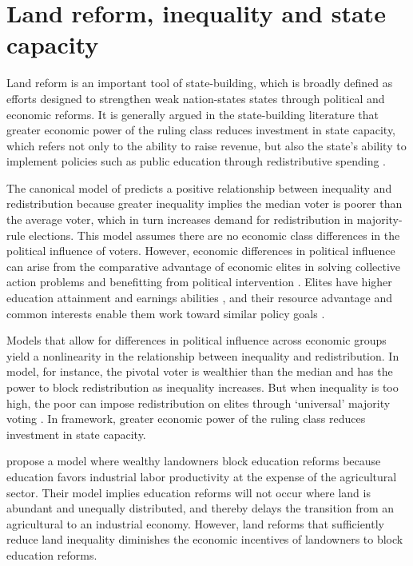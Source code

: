 \section{Land reform, inequality and state capacity}

Land reform is an important tool of state-building, which is broadly defined as efforts designed to strengthen weak nation-states states through political and economic reforms. It is generally argued in the state-building literature that greater economic power of the ruling class reduces investment in state capacity, which refers not only to the ability to raise revenue, but also the state’s ability to implement policies such as public education through redistributive spending \citep{besley2010state}. 

The canonical model of \citet{meltzer1981rational} predicts a positive relationship between inequality and redistribution because greater inequality implies the median voter is poorer than the average voter, which in turn increases demand for redistribution in majority-rule elections. This model assumes there are no economic class differences in the political influence of voters. However, economic differences in political influence can arise from the comparative advantage of economic elites in solving collective action problems and benefitting from political intervention \citep{acemoglu2008persistence}. Elites have higher education attainment and earnings abilities \citep{bourguignon2000oligarchy}, and their resource advantage and common interests enable them work toward similar policy goals \citep{winters2009}. 

Models that allow for differences in political influence across economic groups yield a nonlinearity in the relationship between inequality and redistribution. In  model, for instance, the pivotal voter is wealthier than the median and has the power to block redistribution as inequality increases. But when inequality is too high, the poor can impose redistribution on elites through `universal' majority voting \citep{perotti1993political,saint1993education}. In  framework, greater economic power of the ruling class reduces investment in state capacity. 

\citet{galor2009inequality} propose a model where wealthy landowners block education reforms because education favors industrial labor productivity at the expense of the agricultural sector. Their model implies education reforms will not occur where land is abundant and unequally distributed, and thereby delays the transition from an agricultural to an industrial economy. However, land reforms that sufficiently reduce land inequality diminishes the economic incentives of landowners to block education reforms. 

